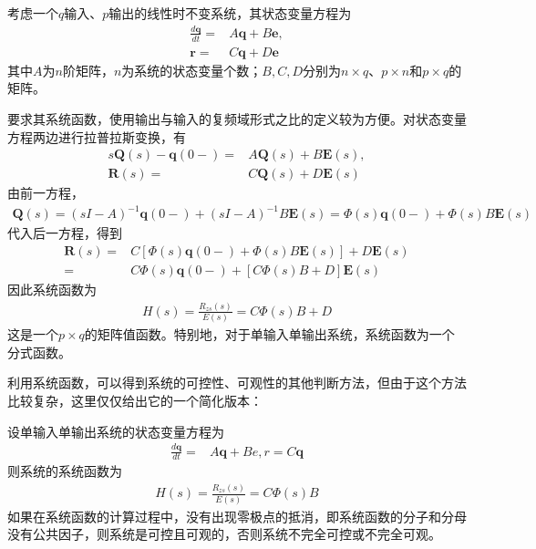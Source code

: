 考虑一个$q$输入、$p$输出的线性时不变系统，其状态变量方程为
\begin{align*}
    \frac{d\mathbf{q}}{dt}=&A\mathbf{q}+B\mathbf{e},\\
    \mathbf{r}=&C\mathbf{q}+D\mathbf{e}
\end{align*}
其中$A$为$n$阶矩阵，$n$为系统的状态变量个数；$B,C,D$分别为$n\times q$、$p\times n$和$p\times q$的矩阵。

要求其系统函数，使用输出与输入的复频域形式之比的定义较为方便。对状态变量方程两边进行拉普拉斯变换，有
\begin{align*}
    s\mathbf{Q}(s)-\mathbf{q}(0-)=&A\mathbf{Q}(s)+B\mathbf{E}(s),\\
    \mathbf{R}(s)=&C\mathbf{Q}(s)+D\mathbf{E}(s)
\end{align*}
由前一方程，
\begin{align*}
    \mathbf{Q}(s)=(sI-A)^{-1}\mathbf{q}(0-)+(sI-A)^{-1}B\mathbf{E}(s)=\Phi(s)\mathbf{q}(0-)+\Phi(s)B\mathbf{E}(s)
\end{align*}
代入后一方程，得到
\begin{align*}
    \mathbf{R}(s)=&C\left[\Phi(s)\mathbf{q}(0-)+\Phi(s)B\mathbf{E}(s)\right]+D\mathbf{E}(s)\\
    =&C\Phi(s)\mathbf{q}(0-)+\left[C\Phi(s)B+D\right]\mathbf{E}(s)
\end{align*}
因此系统函数为
\begin{align*}
    H(s)=\frac{R_{zs}(s)}{E(s)}=C\Phi(s)B+D
\end{align*}
这是一个$p\times q$的矩阵值函数。特别地，对于单输入单输出系统，系统函数为一个分式函数。

利用系统函数，可以得到系统的可控性、可观性的其他判断方法，但由于这个方法比较复杂，这里仅仅给出它的一个简化版本：
\begin{claim}
    设单输入单输出系统的状态变量方程为
    \begin{align*}
        \frac{d\mathbf{q}}{dt}=&A\mathbf{q}+B e,r=C\mathbf{q}
    \end{align*}
    则系统的系统函数为
    \begin{align*}
        H(s)=\frac{R_{zs}(s)}{E(s)}=C\Phi(s)B
    \end{align*}
    如果在系统函数的计算过程中，没有出现零极点的抵消，即系统函数的分子和分母没有公共因子，则系统是可控且可观的，否则系统不完全可控或不完全可观。
\end{claim}
